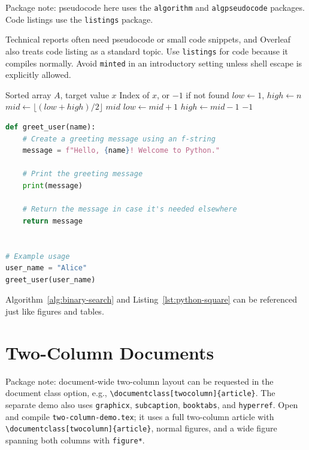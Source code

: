 \documentclass[11pt,a4paper]{article}
\begin{document}
Package note: pseudocode here uses the \texttt{algorithm} and
\texttt{algpseudocode} packages. Code listings use the \texttt{listings}
package.

Technical reports often need pseudocode or small code snippets, and Overleaf
also treats code listing as a standard topic. Use \texttt{listings} for code
because it compiles normally. Avoid \texttt{minted} in an introductory setting
unless shell escape is explicitly allowed.

\begin{algorithm}[H]
    \caption{Binary Search}
    \label{alg:binary-search}
    \begin{algorithmic}[1]
        \Require Sorted array $A$, target value $x$
        \Ensure Index of $x$, or $-1$ if not found
        \State $low \gets 1$, $high \gets n$
            \State $mid \gets \lfloor (low + high)/2 \rfloor$
                \State \Return $mid$
                \State $low \gets mid + 1$
            \Else
                \State $high \gets mid - 1$
            \EndIf
        \EndWhile
        \State \Return $-1$
    \end{algorithmic}
\end{algorithm}

\begin{lstlisting}[language=Python, caption={A small Python function.}, label={lst:python-square}]
def greet_user(name):
    # Create a greeting message using an f-string
    message = f"Hello, {name}! Welcome to Python."

    # Print the greeting message
    print(message)

    # Return the message in case it's needed elsewhere
    return message


# Example usage
user_name = "Alice"
greet_user(user_name)
\end{lstlisting}

Algorithm~\ref{alg:binary-search} and Listing~\ref{lst:python-square} can be
referenced just like figures and tables.

\section{Two-Column Documents}

Package note: document-wide two-column layout can be requested in the document
class option, e.g., \verb|\documentclass[twocolumn]{article}|. The separate
demo also uses \texttt{graphicx}, \texttt{subcaption}, \texttt{booktabs}, and
\texttt{hyperref}. Open and compile \texttt{two-column-demo.tex}; it uses a
full two-column article with \verb|\documentclass[twocolumn]{article}|, normal
figures, and a wide figure spanning both columns with \texttt{figure*}.
\end{document}
